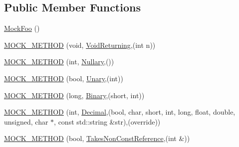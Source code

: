 \subsection*{Public Member Functions}
\begin{DoxyCompactItemize}
\item 
\mbox{\hyperlink{classtesting_1_1gmock__function__mocker__test_1_1_mock_foo_acbbfc5fb080409c8925bc8be2fa6fec4}{Mock\+Foo}} ()
\item 
\mbox{\hyperlink{classtesting_1_1gmock__function__mocker__test_1_1_mock_foo_aa51bd02d682a33eeafaa297c1967455b}{M\+O\+C\+K\+\_\+\+M\+E\+T\+H\+OD}} (void, \mbox{\hyperlink{classtesting_1_1gmock__function__mocker__test_1_1_foo_interface_ab62327ee683b362d9e5579266b74a09c}{Void\+Returning}},(int n))
\item 
\mbox{\hyperlink{classtesting_1_1gmock__function__mocker__test_1_1_mock_foo_aeed9392b4906326c2e5ec651ea9155ca}{M\+O\+C\+K\+\_\+\+M\+E\+T\+H\+OD}} (int, \mbox{\hyperlink{classtesting_1_1gmock__function__mocker__test_1_1_foo_interface_a9440f75381e8a44977c2caee7914098f}{Nullary}},())
\item 
\mbox{\hyperlink{classtesting_1_1gmock__function__mocker__test_1_1_mock_foo_a96c4dd29a859254e057513027a3315c8}{M\+O\+C\+K\+\_\+\+M\+E\+T\+H\+OD}} (bool, \mbox{\hyperlink{classtesting_1_1gmock__function__mocker__test_1_1_foo_interface_a6f28f91c92b59da029ed0cb61c3d1da6}{Unary}},(int))
\item 
\mbox{\hyperlink{classtesting_1_1gmock__function__mocker__test_1_1_mock_foo_a9d6597b94797dfeb1061ad7a48bbc141}{M\+O\+C\+K\+\_\+\+M\+E\+T\+H\+OD}} (long, \mbox{\hyperlink{classtesting_1_1gmock__function__mocker__test_1_1_foo_interface_a8d6e54401a3addca464903257529ace4}{Binary}},(short, int))
\item 
\mbox{\hyperlink{classtesting_1_1gmock__function__mocker__test_1_1_mock_foo_ab6783427c5fb99f8a9c25fba9210c748}{M\+O\+C\+K\+\_\+\+M\+E\+T\+H\+OD}} (int, \mbox{\hyperlink{classtesting_1_1gmock__function__mocker__test_1_1_foo_interface_a2a415a61b9a9c7a69bba9a4b5ef2a63e}{Decimal}},(bool, char, short, int, long, float, double, unsigned, char $\ast$, const std\+::string \&str),(override))
\item 
\mbox{\hyperlink{classtesting_1_1gmock__function__mocker__test_1_1_mock_foo_a50aeadd7e413ca2a8ba4507b21d4b345}{M\+O\+C\+K\+\_\+\+M\+E\+T\+H\+OD}} (bool, \mbox{\hyperlink{classtesting_1_1gmock__function__mocker__test_1_1_foo_interface_aaf21cef138ffa4a8f2372c7fbed95b18}{Takes\+Non\+Const\+Reference}},(int \&))
\item 

\end{DoxyCompactItemize}
